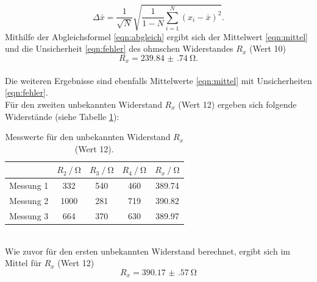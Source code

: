 \begin{equation}
    \Delta \bar{x} = \frac{1}{\sqrt{N}} \sqrt{\frac{1}{1-N} \sum_{i=1}^N (x_i-\bar{x})^2}.
    \label{eqn:fehler}
\end{equation}
Mithilfe der Abgleichsformel \eqref{eqn:abgleich} ergibt sich der Mittelwert \eqref{eqn:mittel} und die Unsicherheit \eqref{eqn:fehler} des ohmschen Widerstandes $R_x$ (Wert 10)
\begin{equation*}
  R_x = \SI{239.84(74)}{\ohm}.
\end{equation*}
\\
Die weiteren Ergebnisse sind ebenfalls Mittelwerte \eqref{eqn:mittel} mit Unsicherheiten \eqref{eqn:fehler}.\\
Für den zweiten unbekannten Widerstand $R_x$ (Wert 12) ergeben sich folgende Widerstände (siehe Tabelle \ref{tab:r_12}):
\begin{table}
  \centering
  \begin{tabular}{c|cccc}
    \toprule
    & {$R_2 \:/\: \si{\ohm}$} & {$R_3\:/\: \si{\ohm}$} & {$R_4\:/\: \si{\ohm}$} & {$R_x\:/\: \si{\ohm}$} \\
    \midrule
  {Messung 1} & 332 & 540 & 460 & 389.74\\
  {Messung 2} & 1000 & 281 & 719 & 390.82\\
  {Messung 3} &  664 & 370 & 630 & 389.97\\
    \bottomrule
  \end{tabular}
  \caption{Messwerte für den unbekannten Widerstand $R_x$ (Wert 12).}
  \label{tab:r_12}
\end{table}
\\
Wie zuvor für den ersten unbekannten Widerstand berechnet, ergibt sich im Mittel für $R_x$ (Wert 12)
\begin{equation*}
  R_x = \SI{390.17(57)}{\ohm}
\end{equation*}

